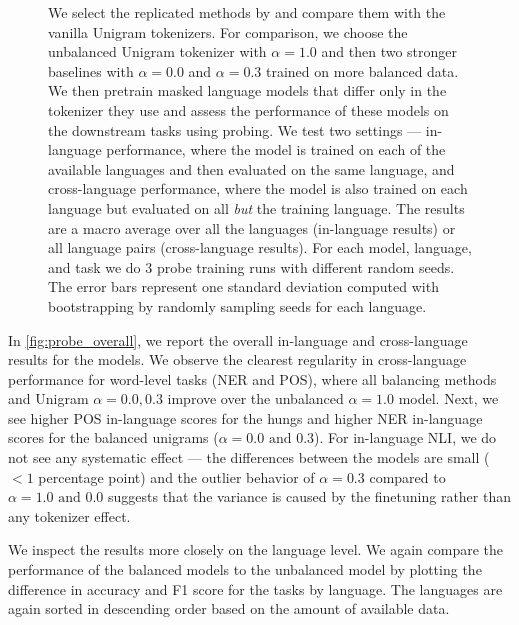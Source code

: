 \begin{figure}
    \caption{We select the replicated methods by \citet{chung_improving_2020,zheng_allocating_2021} and compare them with the vanilla Unigram tokenizers. For comparison, we choose the unbalanced Unigram tokenizer with $\alpha=1.0$ and then two stronger baselines with $\alpha=0.0$ and $\alpha=0.3$ trained on more balanced data. We then pretrain masked language models that differ only in the tokenizer they use and assess the performance of these models on the downstream tasks using probing. We test two settings --- in-language performance, where the model is trained on each of the available languages and then evaluated on the same language, and cross-language performance, where the model is also trained on each language but evaluated on all \textit{but} the training language. The results are a macro average over all the languages (in-language results) or all language pairs (cross-language results). For each model, language, and task we do 3 probe training runs with different random seeds. The error bars represent one standard deviation computed with bootstrapping by randomly sampling seeds for each language.}
    \label{fig:probe_overall}
\end{figure}

In \autoref{fig:probe_overall}, we report the overall in-language and cross-language results for the models. We observe the clearest regularity in cross-language performance for word-level tasks (NER and POS), where all balancing methods and Unigram $\alpha=0.0,0.3$ improve over the unbalanced $\alpha=1.0$ model. Next, we see higher POS in-language scores for the hungs and higher NER in-language scores for the balanced unigrams ($\alpha=0.0\text{ and }0.3$). For in-language NLI, we do not see any systematic effect --- the differences between the models are small ($<1$ percentage point) and the outlier behavior of $\alpha=0.3$ compared to $\alpha=1.0\text{ and }0.0$ suggests that the variance is caused by the finetuning rather than any tokenizer effect.

We inspect the results more closely on the language level. We again compare the performance of the  balanced models to the unbalanced model by plotting the difference in accuracy and F1 score for the tasks by language. The languages are again sorted in descending order based on the amount of available data. 



